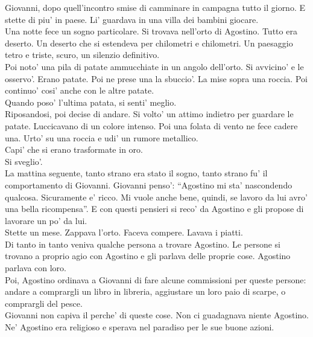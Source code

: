 Giovanni, dopo quell'incontro smise di camminare in campagna tutto il giorno. E stette di piu' in paese. Li' guardava in una villa dei bambini giocare.\\

Una notte fece un sogno particolare. Si trovava nell'orto di Agostino. Tutto era deserto. Un deserto che si estendeva per chilometri e chilometri. Un paesaggio tetro e triste, scuro, un silenzio definitivo.\\
Poi noto' una pila di patate ammucchiate in un angolo dell'orto. Si avvicino' e le osservo'. Erano patate. Poi ne prese una la sbuccio'. La mise sopra una roccia. Poi continuo' cosi' anche con le altre patate.\\
Quando poso' l'ultima patata, si senti' meglio.\\
Riposandosi, poi decise di andare. Si volto' un attimo indietro per guardare le patate. Luccicavano di un colore intenso. Poi una folata di vento ne fece cadere una. Urto' su una roccia e udi' un rumore metallico.\\
Capi' che si erano trasformate in oro.\\
Si sveglio'.\\

La mattina seguente, tanto strano era stato il sogno, tanto strano fu' il comportamento di Giovanni. Giovanni penso': \enquote{Agostino mi sta' nascondendo qualcosa. Sicuramente e' ricco. Mi vuole anche bene, quindi, se lavoro da lui avro' una bella ricompensa}. E con questi pensieri si reco' da Agostino e gli propose di lavorare un po' da lui.\\

Stette un mese. Zappava l'orto. Faceva compere. Lavava i piatti.\\
Di tanto in tanto veniva qualche persona a trovare Agostino. Le persone si trovano a proprio agio con Agostino e gli parlava delle proprie cose. Agostino parlava con loro.\\
Poi, Agostino ordinava a Giovanni di fare alcune commissioni per queste persone: andare a comprargli un libro in libreria, aggiustare un loro paio di scarpe, o comprargli del pesce.\\
Giovanni non capiva il perche' di queste cose. Non ci guadagnava niente Agostino. Ne' Agostino era religioso e sperava nel paradiso per le sue buone azioni.\\

